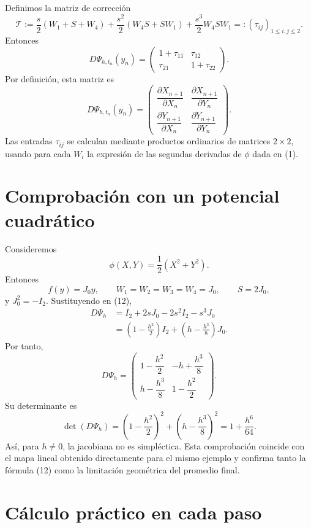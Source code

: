 \documentclass[11pt,a4paper]{article}
\newcommand{\Id}{I}
\begin{document}
Definimos la matriz de corrección
\[
 \mathcal T
 :=\frac{s}{2}(W_1+S+W_4)
 +\frac{s^2}{2}(W_4S+SW_1)
 +\frac{s^3}{2}W_4SW_1
 =:(\tau_{ij})_{1\leq i,j\leq2}.
 \tag{19}
\]
Entonces
\[
 \boxed{
 D\Psi_{h,t_n}(y_n)
 =
 \begin{pmatrix}
  1+\tau_{11}&\tau_{12}\\
  \tau_{21}&1+\tau_{22}
 \end{pmatrix}.}
 \tag{20}
\]
Por definición, esta matriz es
\[
 D\Psi_{h,t_n}(y_n)
 =
 \begin{pmatrix}
  \dfrac{\partial X_{n+1}}{\partial X_n}
  &
  \dfrac{\partial X_{n+1}}{\partial Y_n}\\[2.2ex]
  \dfrac{\partial Y_{n+1}}{\partial X_n}
  &
  \dfrac{\partial Y_{n+1}}{\partial Y_n}
 \end{pmatrix}.
 \tag{21}
\]
Las entradas \(\tau_{ij}\) se calculan mediante productos ordinarios de matrices
\(2\times2\), usando para cada \(W_i\) la expresión de las segundas derivadas de
\(\phi\) dada en (1).

\section{Comprobación con un potencial cuadrático}

Consideremos
\[
 \phi(X,Y)=\frac12(X^2+Y^2).
\]
Entonces
\[
 f(y)=J_0y,
 \qquad
 W_1=W_2=W_3=W_4=J_0,
 \qquad
 S=2J_0,
\]
y \(J_0^2=-\Id_2\). Sustituyendo en (12),
\begin{align*}
 D\Psi_h
 &=\Id_2+2sJ_0-2s^2\Id_2-s^3J_0\\
 &=\left(1-\frac{h^2}{2}\right)\Id_2
   +\left(h-\frac{h^3}{8}\right)J_0.
\end{align*}
Por tanto,
\[
 \boxed{
 D\Psi_h=
 \begin{pmatrix}
  1-\dfrac{h^2}{2}&-h+\dfrac{h^3}{8}\\[1.2ex]
  h-\dfrac{h^3}{8}&1-\dfrac{h^2}{2}
 \end{pmatrix}.}
 \tag{22}
\]
Su determinante es
\[
 \det(D\Psi_h)
 =\left(1-\frac{h^2}{2}\right)^2
  +\left(h-\frac{h^3}{8}\right)^2
 =1+\frac{h^6}{64}.
 \tag{23}
\]
Así, para \(h\neq0\), la jacobiana no es simpléctica. Esta comprobación coincide
con el mapa lineal obtenido directamente para el mismo ejemplo y confirma tanto la
fórmula (12) como la limitación geométrica del promedio final.

\section{Cálculo práctico en cada paso}
\end{document}

